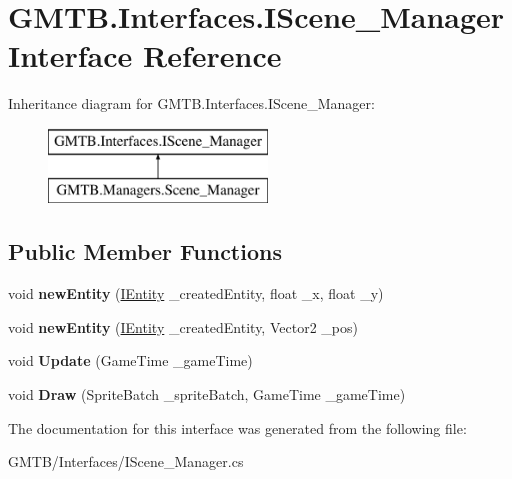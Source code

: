 \hypertarget{interface_g_m_t_b_1_1_interfaces_1_1_i_scene___manager}{}\section{G\+M\+T\+B.\+Interfaces.\+I\+Scene\+\_\+\+Manager Interface Reference}
\label{interface_g_m_t_b_1_1_interfaces_1_1_i_scene___manager}
Inheritance diagram for G\+M\+T\+B.\+Interfaces.\+I\+Scene\+\_\+\+Manager\+:\begin{figure}[H]
\begin{center}
\leavevmode
\includegraphics[height=2.000000cm]{interface_g_m_t_b_1_1_interfaces_1_1_i_scene___manager}
\end{center}
\end{figure}
\subsection*{Public Member Functions}
\begin{DoxyCompactItemize}
\item 
\mbox{\label{interface_g_m_t_b_1_1_interfaces_1_1_i_scene___manager_aa4cc90fe3c6154817fbc09f7b7f4b24d}} 
void {\bfseries new\+Entity} (\mbox{\hyperlink{interface_g_m_t_b_1_1_interfaces_1_1_i_entity}{I\+Entity}} \+\_\+created\+Entity, float \+\_\+x, float \+\_\+y)
\item 
\mbox{\label{interface_g_m_t_b_1_1_interfaces_1_1_i_scene___manager_a32c114b5ad4bfb7aefe7521c104ec08e}} 
void {\bfseries new\+Entity} (\mbox{\hyperlink{interface_g_m_t_b_1_1_interfaces_1_1_i_entity}{I\+Entity}} \+\_\+created\+Entity, Vector2 \+\_\+pos)
\item 
\mbox{\label{interface_g_m_t_b_1_1_interfaces_1_1_i_scene___manager_ab4d99db88b06e11f5dce64ba4ec1dbf2}} 
void {\bfseries Update} (Game\+Time \+\_\+game\+Time)
\item 
\mbox{\label{interface_g_m_t_b_1_1_interfaces_1_1_i_scene___manager_a023004dd4c9202c280267164736b17ca}} 
void {\bfseries Draw} (Sprite\+Batch \+\_\+sprite\+Batch, Game\+Time \+\_\+game\+Time)
\end{DoxyCompactItemize}


The documentation for this interface was generated from the following file\+:\begin{DoxyCompactItemize}
\item 
G\+M\+T\+B/\+Interfaces/I\+Scene\+\_\+\+Manager.\+cs\end{DoxyCompactItemize}
